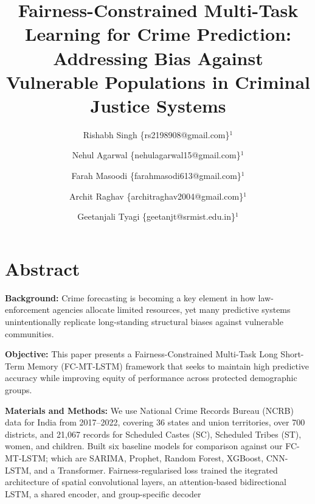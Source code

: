 \documentclass{svproc}
\newcommand{\modelname}{FC-MT-LSTM}
\begin{document}
\title{Fairness-Constrained Multi-Task Learning for Crime Prediction:\\
Addressing Bias Against Vulnerable Populations in Criminal Justice Systems}

\author{Rishabh Singh \{rs2198908@gmail.com\}$^{1}$ \and
Nehul Agarwal \{nehulagarwal15@gmail.com\}$^{1}$ \and
Farah Masoodi \{farahmasodi613@gmail.com\}$^{1}$ \and
Archit Raghav \{architraghav2004@gmail.com\}$^{1}$ \and
Geetanjali Tyagi \{geetanjt@srmist.edu.in\}$^{1}$}


\authorrunning{ }
\maketitle

\section{Abstract}

\noindent\textbf{Background:} Crime forecasting is becoming a key element in how law-enforcement agencies allocate limited resources, yet many predictive systems unintentionally replicate long-standing structural biases against vulnerable communities.

\noindent\textbf{Objective:} This paper presents a Fairness-Constrained Multi-Task Long Short-Term Memory (\modelname{}) framework that seeks to maintain high predictive accuracy while improving equity of performance across protected demographic groups.

\noindent\textbf{Materials and Methods:} We use National Crime Records Bureau (NCRB) data for India from 2017--2022, covering 36 states and union territories, over 700 districts, and 21{,}067 records for Scheduled Castes (SC), Scheduled Tribes (ST), women, and children. Built six baseline models for comparison against our \modelname{}; which are SARIMA, Prophet, Random Forest, XGBoost, CNN-LSTM, and a Transformer. Fairness-regularised loss trained the itegrated architecture of spatial convolutional layers, an attention-based bidirectional LSTM, a shared encoder, and group-specific decoder
\end{document}
